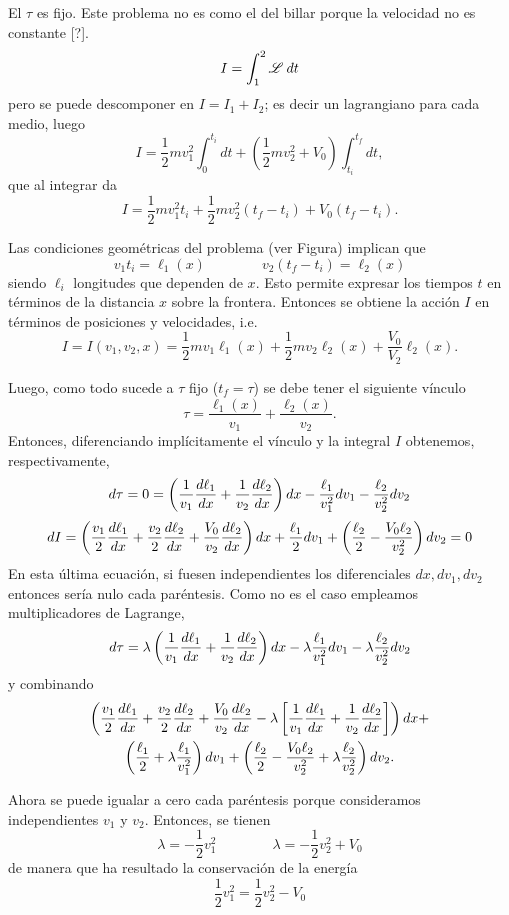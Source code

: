 \documentclass[10pt,oneside]{CBFT_book}
\begin{document}
El $ \tau $ es fijo.
Este problema no es como el del billar porque la velocidad no es constante [?].
\[
	I = \int_1^2 \mathscr{L} \: dt 
\]
pero se puede descomponer en $ I = I_1 + I_2 $; es decir un lagrangiano para cada medio, luego
\[
	I = \frac{1}{2} m v_1^2 \int_0^{t_i} dt + (\frac{1}{2} m v_2^2 + V_0) \int_{t_i}^{t_f} dt ,
\]
que al integrar da
\[
	I = \frac{1}{2} m v_1^2 t_i + \frac{1}{2} m v_2^2( t_f - t_i ) + V_0( t_f - t_i ).
\]

Las condiciones geométricas del problema (ver Figura) implican que 
\[
	v_1 t_i = \ell_1(x) \qquad \qquad v_2 ( t_f - t_i ) = \ell_2(x)
\]
siendo $ \ell_i $ longitudes que dependen de $ x $. Esto permite expresar los tiempos $t$ en términos
de la distancia $ x $ sobre la frontera. Entonces se obtiene la acción $I$ en términos de posiciones
y velocidades, i.e.
\[
	I = I(v_1,v_2 ,x) = \frac{1}{2} m v_1 \ell_1(x) + \frac{1}{2} m v_2 \ell_2(x) + \frac{V_0}{V_2} \ell_2(x).
\]

Luego, como todo sucede a $\tau$ fijo ($t_f=\tau$) se debe tener el siguiente vínculo
\[
	\tau = \frac{\ell_1(x)}{v_1} + \frac{\ell_2(x)}{v_2}.
\]
Entonces, diferenciando implícitamente el vínculo y la integral $I$ obtenemos, respectivamente,
\[
	d\tau = 0 = \left( \frac{1}{v_1} \frac{d^{\hspace{-0.05em}} {\ell_1}}{d {x}^{\hspace{-0.05em}}} + \frac{1}{v_2} \frac{d^{\hspace{-0.05em}} {\ell_2}}{d {x}^{\hspace{-0.05em}}} \right) dx
	-\frac{\ell_1}{v_1^2} dv_1 - \frac{\ell_2}{v_2^2}dv_2
\]
\[
	dI = \left(  \frac{v_1}{2} \frac{d^{\hspace{-0.05em}} {\ell_1}}{d {x}^{\hspace{-0.05em}}} +  \frac{v_2}{2} \frac{d^{\hspace{-0.05em}} {\ell_2}}{d {x}^{\hspace{-0.05em}}} + 
	 \frac{V_0}{v_2} \frac{d^{\hspace{-0.05em}} {\ell_2}}{d {x}^{\hspace{-0.05em}}} \right) dx + 
	\frac{\ell_1}{2} dv_1 + \left( \frac{\ell_2}{2} - \frac{V_0 \ell_2}{v_2^2} \right)dv_2 = 0
\]
En esta última ecuación, si fuesen independientes los diferenciales $dx,dv_1,dv_2$ entonces sería nulo cada
paréntesis. Como no es el caso empleamos multiplicadores de Lagrange,
\[
	d\tau = \lambda \left( \frac{1}{v_1} \frac{d^{\hspace{-0.05em}} {\ell_1}}{d {x}^{\hspace{-0.05em}}} + \frac{1}{v_2} \frac{d^{\hspace{-0.05em}} {\ell_2}}{d {x}^{\hspace{-0.05em}}} \right) dx
	- \lambda \frac{\ell_1}{v_1^2} dv_1 - \lambda \frac{\ell_2}{v_2^2}dv_2
\]
y combinando
\begin{multline*}
 	\left(  \frac{v_1}{2} \frac{d^{\hspace{-0.05em}} {\ell_1}}{d {x}^{\hspace{-0.05em}}} +  \frac{v_2}{2} \frac{d^{\hspace{-0.05em}} {\ell_2}}{d {x}^{\hspace{-0.05em}}} + 
	 \frac{V_0}{v_2} \frac{d^{\hspace{-0.05em}} {\ell_2}}{d {x}^{\hspace{-0.05em}}} - \lambda \left[ \frac{1}{v_1} \frac{d^{\hspace{-0.05em}} {\ell_1}}{d {x}^{\hspace{-0.05em}}} + \frac{1}{v_2} 
	\frac{d^{\hspace{-0.05em}} {\ell_2}}{d {x}^{\hspace{-0.05em}}}  \right] \right) dx + \\
	\left( \frac{\ell_1}{2} + \lambda \frac{\ell_1}{v_1^2} \right) dv_1 + 
	\left( \frac{\ell_2}{2} - \frac{V_0 \ell_2}{v_2^2} + \lambda \frac{\ell_2}{v_2^2} \right)dv_2.
\end{multline*}

Ahora se puede igualar a cero cada paréntesis porque consideramos independientes $v_1$ y $v_2$.
Entonces, se tienen
\[
	\lambda = -\frac{1}{2}v_1^2 \qquad \qquad \lambda = -\frac{1}{2}v_2^2 + V_0
\]
de manera que ha resultado la conservación de la energía
\[
	\frac{1}{2}v_1^2 = \frac{1}{2}v_2^2 - V_0
\]
\end{document}
